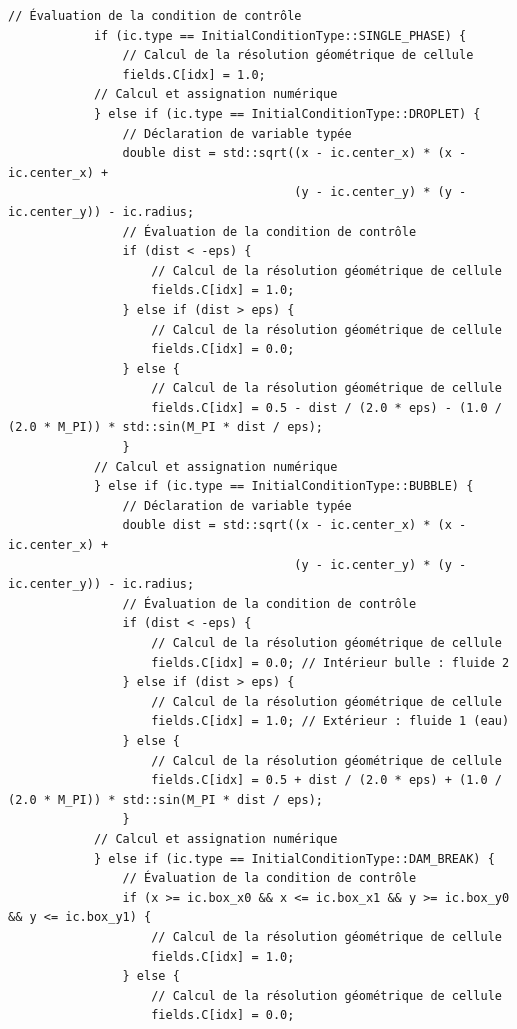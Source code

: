 \documentclass[10pt,a4paper,oneside]{book}
\begin{document}
\begin{lstlisting}[language={[11]C++}]
            // Évaluation de la condition de contrôle
            if (ic.type == InitialConditionType::SINGLE_PHASE) {
                // Calcul de la résolution géométrique de cellule
                fields.C[idx] = 1.0;
            // Calcul et assignation numérique
            } else if (ic.type == InitialConditionType::DROPLET) {
                // Déclaration de variable typée
                double dist = std::sqrt((x - ic.center_x) * (x - ic.center_x) +
                                        (y - ic.center_y) * (y - ic.center_y)) - ic.radius;
                // Évaluation de la condition de contrôle
                if (dist < -eps) {
                    // Calcul de la résolution géométrique de cellule
                    fields.C[idx] = 1.0;
                } else if (dist > eps) {
                    // Calcul de la résolution géométrique de cellule
                    fields.C[idx] = 0.0;
                } else {
                    // Calcul de la résolution géométrique de cellule
                    fields.C[idx] = 0.5 - dist / (2.0 * eps) - (1.0 / (2.0 * M_PI)) * std::sin(M_PI * dist / eps);
                }
            // Calcul et assignation numérique
            } else if (ic.type == InitialConditionType::BUBBLE) {
                // Déclaration de variable typée
                double dist = std::sqrt((x - ic.center_x) * (x - ic.center_x) +
                                        (y - ic.center_y) * (y - ic.center_y)) - ic.radius;
                // Évaluation de la condition de contrôle
                if (dist < -eps) {
                    // Calcul de la résolution géométrique de cellule
                    fields.C[idx] = 0.0; // Intérieur bulle : fluide 2
                } else if (dist > eps) {
                    // Calcul de la résolution géométrique de cellule
                    fields.C[idx] = 1.0; // Extérieur : fluide 1 (eau)
                } else {
                    // Calcul de la résolution géométrique de cellule
                    fields.C[idx] = 0.5 + dist / (2.0 * eps) + (1.0 / (2.0 * M_PI)) * std::sin(M_PI * dist / eps);
                }
            // Calcul et assignation numérique
            } else if (ic.type == InitialConditionType::DAM_BREAK) {
                // Évaluation de la condition de contrôle
                if (x >= ic.box_x0 && x <= ic.box_x1 && y >= ic.box_y0 && y <= ic.box_y1) {
                    // Calcul de la résolution géométrique de cellule
                    fields.C[idx] = 1.0;
                } else {
                    // Calcul de la résolution géométrique de cellule
                    fields.C[idx] = 0.0;

\end{lstlisting}
\end{document}
